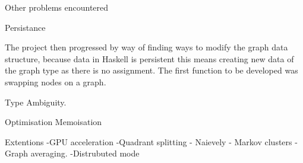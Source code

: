 \documentclass[main.tex]{subfiles}
\begin{document}
Other problems encountered

Persistance

The project then progressed by way of finding ways to modify the graph data structure, because data in Haskell is persistent this means creating new data of the graph type as there is no assignment. The first function to be developed was swapping nodes on a graph. 

Type Ambiguity.

Optimisation
Memoisation

Extentions
-GPU acceleration
-Quadrant splitting - Naievely - Markov clusters - Graph averaging.
-Distrubuted mode
\end{document}
